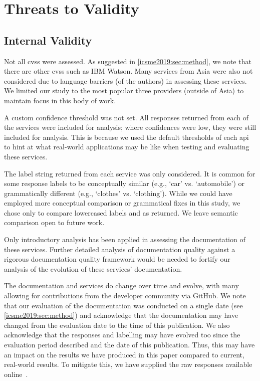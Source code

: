 \section{Threats to Validity}
\label{icsme2019:sec:limitations}

\subsection{Internal Validity}
Not all \glspl{cvs} were assessed. As suggested in \cref{icsme2019:sec:method}, we note that there are other \glspl{cvs} such as IBM Watson. Many services from Asia were also not considered due to language barriers (of the authors) in assessing these services. We limited our study to the most popular three providers (outside of Asia) to maintain focus in this body of work.
 
A custom confidence threshold was not set. All responses returned from each of the services were included for analysis; where confidences were low, they were still included for analysis. This is because we used the default thresholds of each \gls{api} to hint at what real-world applications may be like when testing and evaluating these services.

The label string returned from each service was only considered. It is common for some response labels to be conceptually similar (e.g., `car' vs. `automobile') or grammatically different (e.g., `clothes' vs. `clothing'). While we could have employed more conceptual comparison or grammatical fixes in this study, we chose only to compare lowercased labels and as returned. We leave semantic comparison open to future work.

Only introductory analysis has been applied in assessing the documentation of these services. Further detailed analysis of documentation quality against a rigorous documentation quality framework would be needed to fortify our analysis of the evolution of these services' documentation.

The documentation and services do change over time and evolve, with many allowing for contributions from the developer community via GitHub. We note that our evaluation of the documentation was conducted on a single date (see \cref{icsme2019:sec:method}) and acknowledge that the documentation may have changed from the evaluation date to the time of this publication. We also acknowledge that the responses and labelling may have evolved too since the evaluation period described and the date of this publication. Thus, this may have an impact on the results we have produced in this paper compared to current, real-world results. To mitigate this, we have supplied the raw responses available online~.

